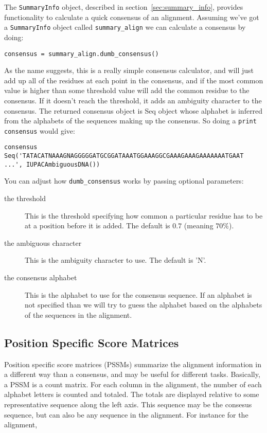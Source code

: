 The \verb|SummaryInfo| object, described in section~\ref{sec:summary_info}, provides functionality to calculate a quick consensus of an alignment. Assuming we've got a \verb|SummaryInfo| object called \verb|summary_align| we can calculate a consensus by doing:

\begin{verbatim}
consensus = summary_align.dumb_consensus()
\end{verbatim}

As the name suggests, this is a really simple consensus calculator, and will just add up all of the residues at each point in the consensus, and if the most common value is higher than some threshold value will add the common residue to the consensus. If it doesn't reach the threshold, it adds an ambiguity character to the consensus. The returned consensus object is Seq object whose alphabet is inferred from the alphabets of the sequences making up the consensus. So doing a \verb|print consensus| would give:

\begin{verbatim}
consensus Seq('TATACATNAAAGNAGGGGGATGCGGATAAATGGAAAGGCGAAAGAAAGAAAAAAATGAAT
...', IUPACAmbiguousDNA())
\end{verbatim}

You can adjust how \verb|dumb_consensus| works by passing optional parameters:

\begin{description}
\item[the threshold] This is the threshold specifying how common a particular residue has to be at a position before it is added. The default is $0.7$ (meaning $70\%$).

\item[the ambiguous character] This is the ambiguity character to use. The default is 'N'.

\item[the consensus alphabet] This is the alphabet to use for the consensus sequence. If an alphabet is not specified than we will try to guess the alphabet based on the alphabets of the sequences in the alignment.
\end{description}

\subsection{Position Specific Score Matrices}
\label{sec:pssm}

Position specific score matrices (PSSMs) summarize the alignment information in a different way than a consensus, and may be useful for different tasks. Basically, a PSSM is a count matrix. For each column in the alignment, the number of each alphabet letters is counted and totaled. The totals are displayed relative to some representative sequence along the left axis. This sequence may be the consesus sequence, but can also be any sequence in the alignment. For instance for the alignment,

